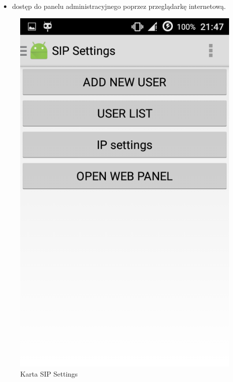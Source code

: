 \begin{itemize}
\begin{itemize}
\item dostęp do panelu administracyjnego poprzez przeglądarkę internetową.
\end{itemize}
    
\begin{figure}[H]
	\centering
	\includegraphics[width=0.5\linewidth]{Screenshot_2015-09-20-21-47-54}
	\caption{Karta SIP Settings}
	\label{fig:Screenshot_2015-09-20-21-47-54}
\end{figure}


\begin{figure}[H]
	\centering
 

\end{figure}
\end{itemize}
